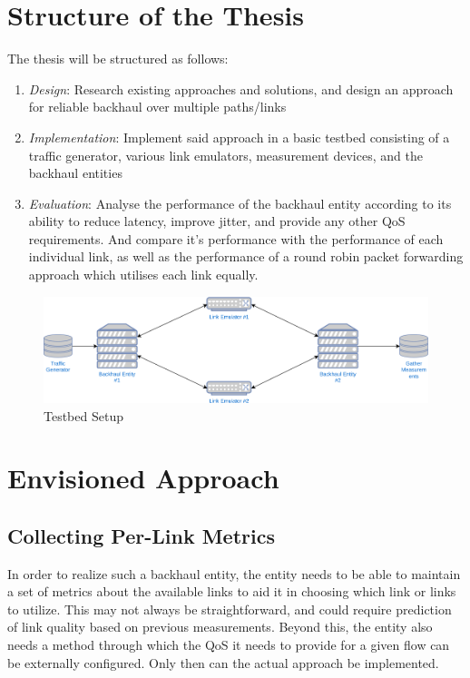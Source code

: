 \section{Structure of the Thesis}
\label{sec:structure}

The thesis will be structured as follows:

\begin{enumerate}
\item{\textit{Design}: Research existing approaches and solutions, and design an approach for reliable backhaul over multiple paths/links}
\item{\textit{Implementation}: Implement said approach in a basic testbed consisting of a traffic generator, various link emulators, measurement devices, and the backhaul entities}
\item{\textit{Evaluation}: Analyse the performance of the backhaul entity according to its ability to reduce latency, improve jitter, and provide any other QoS requirements. And compare it's performance with the performance of each individual link, as well as the performance of a round robin packet forwarding approach which utilises each link equally.}

\end{enumerate}

\begin{figure}[h]
    \centering
        \includegraphics[width=\textwidth]{fig/testbed.png}
        \caption{Testbed Setup}
        \label{fig:testbed}
\end{figure}


\section{Envisioned Approach}

\subsection{Collecting Per-Link Metrics}
In order to realize such a backhaul entity, the entity needs to be able to maintain a  set of metrics about the available links to aid it in choosing which link or links to utilize. This may not always be straightforward, and could require prediction of link quality based on previous measurements. Beyond this, the entity also needs a method through which the QoS it needs to provide for a given flow can be externally configured. Only then can the actual approach be implemented.

